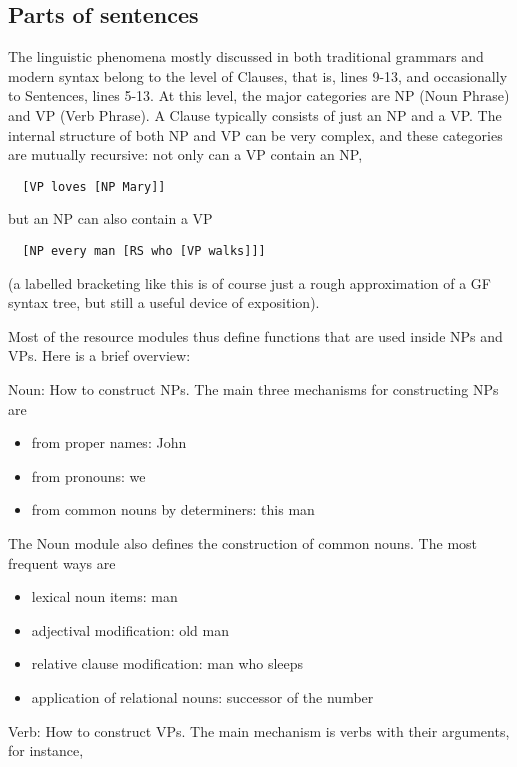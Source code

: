 \documentclass[11pt,a4paper]{article}
\begin{document}
\subsection{Parts of sentences}
The linguistic phenomena mostly discussed in both traditional grammars and modern
syntax belong to the level of Clauses, that is, lines 9-13, and occasionally
to Sentences, lines 5-13. At this level, the major categories are
NP (Noun Phrase) and VP (Verb Phrase). A Clause typically consists of just an
NP and a VP. The internal structure of both NP and VP can be very complex,
and these categories are mutually recursive: not only can a VP contain an NP,

\begin{verbatim}
  [VP loves [NP Mary]]
\end{verbatim}
but an NP can also contain a VP

\begin{verbatim}
  [NP every man [RS who [VP walks]]]
\end{verbatim}
(a labelled bracketing like this is of course just a rough approximation of
a GF syntax tree, but still a useful device of exposition).

Most of the resource modules thus define functions that are used inside
NPs and VPs. Here is a brief overview:

Noun: How to construct NPs. The main three mechanisms 
for constructing NPs are

\begin{itemize}
\item from proper names: John
\item from pronouns: we
\item from common nouns by determiners: this man
\end{itemize}

The Noun module also defines the construction of common nouns. The most frequent ways are

\begin{itemize}
\item lexical noun items: man
\item adjectival modification: old man
\item relative clause modification: man who sleeps
\item application of relational nouns: successor of the number
\end{itemize}

Verb: How to construct VPs. The main mechanism is verbs with their arguments, for instance,
\end{document}

